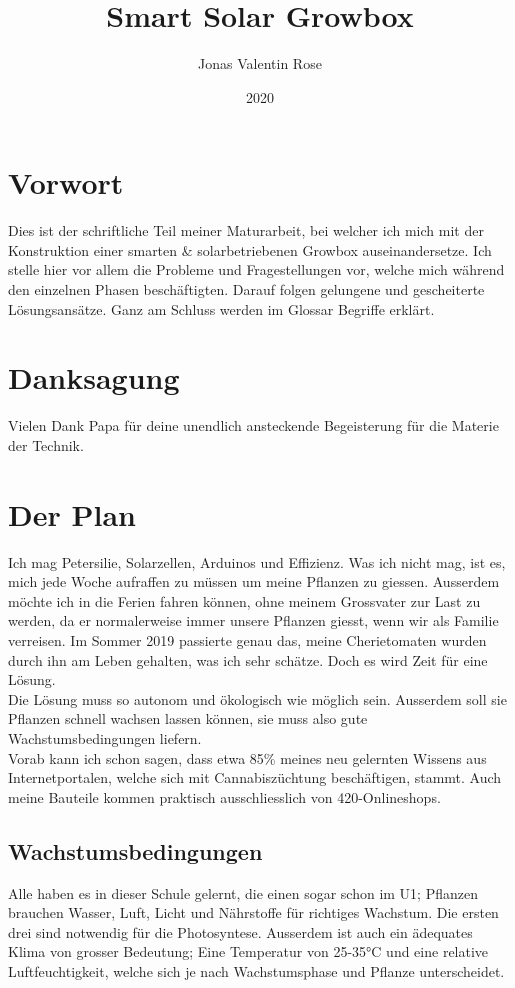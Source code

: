 \documentclass[12pt,titlepage,a4paper]{article}
\begin{document}
\begin{titlepage}
\title{Smart Solar Growbox}
\date{2020}
\author{Jonas Valentin Rose}
\end{titlepage}
\maketitle 
\tableofcontents
\newpage
\section{Vorwort}
Dies ist der schriftliche Teil meiner Maturarbeit, bei welcher ich mich  mit der Konstruktion einer smarten \& solarbetriebenen Growbox auseinandersetze. Ich stelle hier vor allem die Probleme und Fragestellungen vor, welche mich während den einzelnen Phasen beschäftigten. Darauf folgen gelungene und gescheiterte Lösungsansätze. Ganz am Schluss werden im Glossar Begriffe erklärt.

\section{Danksagung}
Vielen Dank Papa für deine unendlich ansteckende Begeisterung für die Materie der Technik.
\section{Der Plan}
Ich mag Petersilie, Solarzellen, Arduinos und Effizienz. Was ich nicht mag, ist es, mich jede Woche aufraffen zu müssen um meine Pflanzen zu giessen. Ausserdem möchte ich in die Ferien fahren können, ohne meinem Grossvater zur Last zu werden, da er normalerweise immer unsere Pflanzen giesst, wenn wir als Familie verreisen. Im Sommer 2019 passierte genau das, meine Cherietomaten wurden durch ihn am Leben gehalten, was ich sehr schätze. Doch es wird Zeit für eine Lösung. \\Die Lösung muss so autonom und ökologisch wie möglich sein. Ausserdem soll sie Pflanzen schnell wachsen lassen können, sie muss also gute Wachstumsbedingungen liefern. \\ Vorab kann ich schon sagen, dass etwa 85\% meines neu gelernten Wissens aus Internetportalen, welche sich mit Cannabiszüchtung beschäftigen, stammt. Auch meine Bauteile kommen praktisch ausschliesslich von 420-Onlineshops. 
\subsection{Wachstumsbedingungen}
Alle haben es in dieser Schule gelernt, die einen sogar schon im U1; Pflanzen brauchen Wasser, Luft, Licht und Nährstoffe für richtiges Wachstum. Die ersten drei sind notwendig für die Photosyntese. Ausserdem ist auch ein ädequates Klima von grosser Bedeutung; Eine Temperatur von 25-35°C und eine relative Luftfeuchtigkeit, welche sich je nach Wachstumsphase und Pflanze unterscheidet.
\end{document}
